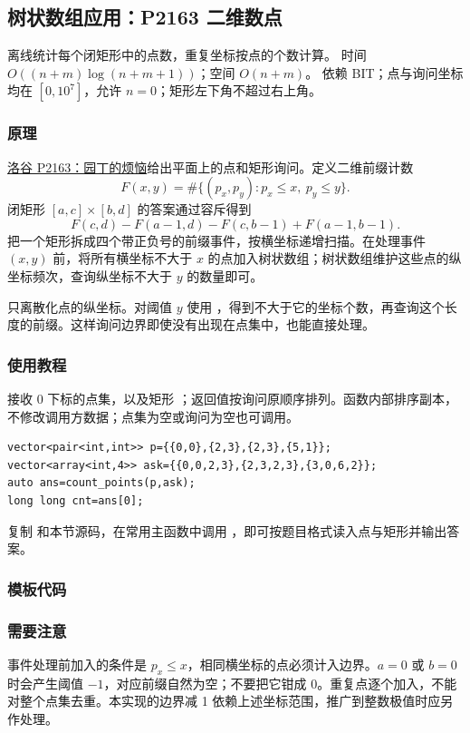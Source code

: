 \subsection{树状数组应用：P2163 二维数点}
\label{ds:bit-2d-count}
\AlgorithmInfo
    {离线统计每个闭矩形中的点数，重复坐标按点的个数计算。}
    {时间 $O((n+m)\log(n+m+1))$；空间 $O(n+m)$。}
    {依赖 BIT；点与询问坐标均在 $[0,10^7]$，允许 $n=0$；矩形左下角不超过右上角。}
\subsubsection*{原理}
\href{https://www.luogu.com.cn/problem/P2163}{洛谷 P2163：园丁的烦恼}给出平面上的点和矩形询问。定义二维前缀计数
\[
 F(x,y)=\#\{(p_x,p_y):p_x\le x,\ p_y\le y\}.
\]
闭矩形 $[a,c]\times[b,d]$ 的答案通过容斥得到
\[
 F(c,d)-F(a-1,d)-F(c,b-1)+F(a-1,b-1).
\]
把一个矩形拆成四个带正负号的前缀事件，按横坐标递增扫描。在处理事件 $(x,y)$ 前，将所有横坐标不大于 $x$ 的点加入树状数组；树状数组维护这些点的纵坐标频次，查询纵坐标不大于 $y$ 的数量即可。

只离散化点的纵坐标。对阈值 $y$ 使用 ，得到不大于它的坐标个数，再查询这个长度的前缀。这样询问边界即使没有出现在点集中，也能直接处理。
\subsubsection*{使用教程}
 接收 0 下标的点集，以及矩形 ；返回值按询问原顺序排列。函数内部排序副本，不修改调用方数据；点集为空或询问为空也可调用。
\begin{lstlisting}[style=mtycpp,numbers=none]
vector<pair<int,int>> p={{0,0},{2,3},{2,3},{5,1}};
vector<array<int,4>> ask={{0,0,2,3},{2,3,2,3},{3,0,6,2}};
auto ans=count_points(p,ask);
long long cnt=ans[0];
\end{lstlisting}
复制  和本节源码，在常用主函数中调用 ，即可按题目格式读入点与矩形并输出答案。
\subsubsection*{模板代码}
\subsubsection*{需要注意}
事件处理前加入的条件是 $p_x\le x$，相同横坐标的点必须计入边界。$a=0$ 或 $b=0$ 时会产生阈值 $-1$，对应前缀自然为空；不要把它钳成 0。重复点逐个加入，不能对整个点集去重。本实现的边界减 1 依赖上述坐标范围，推广到整数极值时应另作处理。
